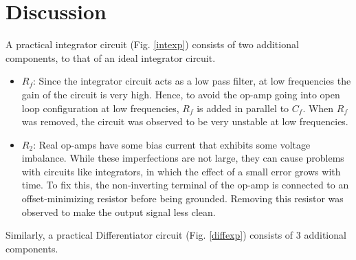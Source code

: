 \section{Discussion}

A practical integrator circuit (Fig. \ref{intexp}) consists of two additional components, to that of an ideal integrator circuit.\\

\begin{itemize}
    \item $R_f$: Since the integrator circuit acts as a low pass filter, at low frequencies the gain of the circuit is very high. Hence, to avoid the op-amp going into open loop configuration at low frequencies, $R_f$ is added in parallel to $C_f$. When $R_f$ was removed, the circuit was observed to be very unstable at low frequencies.\\
    \item $R_2$: Real op-amps have some bias current that exhibits some voltage imbalance. While these imperfections are not large, they can cause problems with circuits like integrators, in which the effect of a small error grows with time. To fix this, the non-inverting terminal of the op-amp is connected to an offset-minimizing resistor before being grounded. Removing this resistor was observed to make the output signal less clean.\\
\end{itemize}

Similarly, a practical Differentiator circuit (Fig. \ref{diffexp}) consists of 3 additional components.\\

